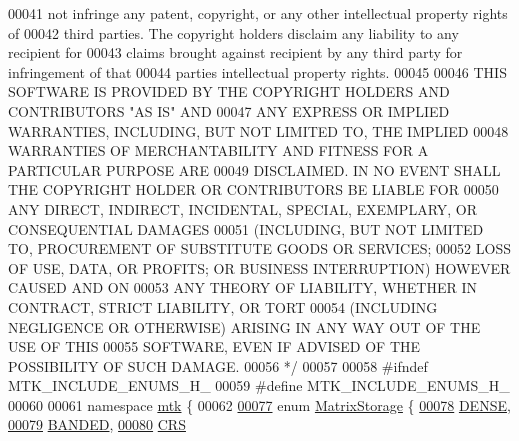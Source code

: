 \begin{DoxyCode}
00041 \textcolor{comment}{not infringe any patent, copyright, or any other intellectual property rights of}
00042 \textcolor{comment}{third parties. The copyright holders disclaim any liability to any recipient for}
00043 \textcolor{comment}{claims brought against recipient by any third party for infringement of that}
00044 \textcolor{comment}{parties intellectual property rights.}
00045 \textcolor{comment}{}
00046 \textcolor{comment}{THIS SOFTWARE IS PROVIDED BY THE COPYRIGHT HOLDERS AND CONTRIBUTORS "AS IS" AND}
00047 \textcolor{comment}{ANY EXPRESS OR IMPLIED WARRANTIES, INCLUDING, BUT NOT LIMITED TO, THE IMPLIED}
00048 \textcolor{comment}{WARRANTIES OF MERCHANTABILITY AND FITNESS FOR A PARTICULAR PURPOSE ARE}
00049 \textcolor{comment}{DISCLAIMED. IN NO EVENT SHALL THE COPYRIGHT HOLDER OR CONTRIBUTORS BE LIABLE FOR}
00050 \textcolor{comment}{ANY DIRECT, INDIRECT, INCIDENTAL, SPECIAL, EXEMPLARY, OR CONSEQUENTIAL DAMAGES}
00051 \textcolor{comment}{(INCLUDING, BUT NOT LIMITED TO, PROCUREMENT OF SUBSTITUTE GOODS OR SERVICES;}
00052 \textcolor{comment}{LOSS OF USE, DATA, OR PROFITS; OR BUSINESS INTERRUPTION) HOWEVER CAUSED AND ON}
00053 \textcolor{comment}{ANY THEORY OF LIABILITY, WHETHER IN CONTRACT, STRICT LIABILITY, OR TORT}
00054 \textcolor{comment}{(INCLUDING NEGLIGENCE OR OTHERWISE) ARISING IN ANY WAY OUT OF THE USE OF THIS}
00055 \textcolor{comment}{SOFTWARE, EVEN IF ADVISED OF THE POSSIBILITY OF SUCH DAMAGE.}
00056 \textcolor{comment}{*/}
00057 
00058 \textcolor{preprocessor}{#ifndef MTK\_INCLUDE\_ENUMS\_H\_}
00059 \textcolor{preprocessor}{#define MTK\_INCLUDE\_ENUMS\_H\_}
00060 
00061 \textcolor{keyword}{namespace }\hyperlink{namespacemtk}{mtk} \{
00062 
\hypertarget{mtk__enums_8h_source_l00077}{}\hyperlink{group__c02-enums_ga25b67ec6a2afeee69f9bb196a9c66619}{00077} \textcolor{keyword}{enum} \hyperlink{group__c02-enums_ga25b67ec6a2afeee69f9bb196a9c66619}{MatrixStorage} \{
\hypertarget{mtk__enums_8h_source_l00078}{}\hyperlink{namespacemtk_ga25b67ec6a2afeee69f9bb196a9c66619a00a806d43a7d74e9ccca47a2134e9c87}{00078}   \hyperlink{namespacemtk_ga25b67ec6a2afeee69f9bb196a9c66619a00a806d43a7d74e9ccca47a2134e9c87}{DENSE},    
\hypertarget{mtk__enums_8h_source_l00079}{}\hyperlink{namespacemtk_ga25b67ec6a2afeee69f9bb196a9c66619aef1d4271d5005282978a3a40a8a52c9b}{00079}   \hyperlink{namespacemtk_ga25b67ec6a2afeee69f9bb196a9c66619aef1d4271d5005282978a3a40a8a52c9b}{BANDED},   
\hypertarget{mtk__enums_8h_source_l00080}{}\hyperlink{namespacemtk_ga25b67ec6a2afeee69f9bb196a9c66619a87619d374775e937bca967402b988b8b}{00080}   \hyperlink{namespacemtk_ga25b67ec6a2afeee69f9bb196a9c66619a87619d374775e937bca967402b988b8b}{CRS}       

\end{DoxyCode}
